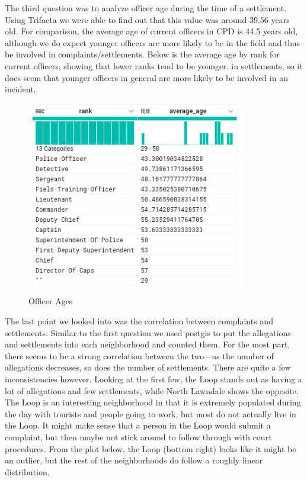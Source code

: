 \documentclass[11pt]{article}
\begin{document}
The third question was to analyze officer age during the time of a settlement. Using Trifacta we were able to find out that this value was around 39.56 years old. For comparison, the average age of current officers in CPD is 44.5 years old, although we do expect younger officers are more likely to be in the field and thus be involved in complaints/settlements. Below is the average age by rank for current officers, showing that lower ranks tend to be younger. in settlements, so it does seem that younger officers in general are more likely to be involved in an incident.

\begin{figure}[h!]
\centering
\caption{Officer Ages}
\includegraphics[width=0.85\textwidth]{ages.png}
\end{figure}

The last point we looked into was the correlation between complaints and settlements. Similar to the first question we used postgis to put the allegations and settlements into each neighborhood and counted them. For the most part, there seems to be a strong correlation between the two---as the number of allegations decreases, so does the number of settlements. There are quite a few inconsistencies however. Looking at the first few, the Loop stands out as having a lot of allegations and few settlements, while North Lawndale shows the opposite. The Loop is an interesting neighborhood in that it is extremely populated during the day with tourists and people going to work, but most do not actually live in the Loop. It might make sense that a person in the Loop would submit a complaint, but then maybe not stick around to follow through with court procedures. From the plot below, the Loop (bottom right) looks like it might be an outlier, but the rest of the neighborhoods do follow a roughly linear distribution.
\end{document}
